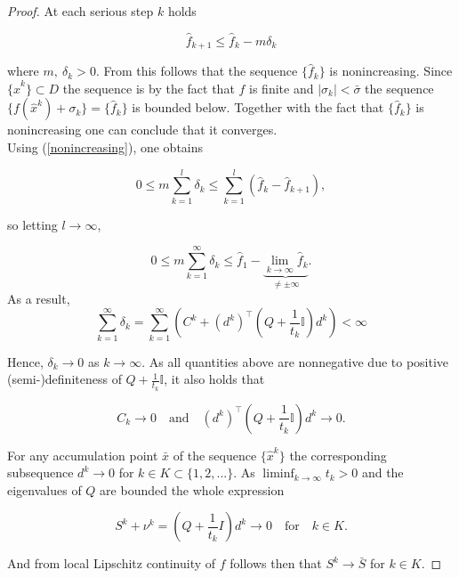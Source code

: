 \begin{proof}
	At each serious step \(k\) holds
	
	\begin{equation}
		\hat{f}_{k+1} \leq \hat{f}_k - m\delta_k
	\label{nonincreasing}
	\end{equation}
	
	where \(m, ~\delta_k > 0\). From this follows that the sequence \(\{\hat{f}_k\}\) is nonincreasing.
	Since \(\{\hat{x}^k\} \subset D\) the sequence is by the fact that \(f\) is finite %
	and \(|\sigma_k| < \bar{\sigma}\) the sequence \(\{f(\hat{x}^k)+\sigma_k\} = \{\hat{f}_k\}\) is bounded below. Together with the fact that \(\{\hat{f}_k\}\) is nonincreasing one can conclude that it converges. \\
	Using (\ref{nonincreasing}), one obtains
	
	\begin{equation}
		0 \leq m \sum_{k = 1}^l \delta_k \leq \sum_{k = 1}^l \left(\hat{f}_k-\hat{f}_{k+1}\right),
	\end{equation}
	
	so letting \(l \to \infty\), 
	
	\begin{equation}
		0 \leq m\sum_{k=1}^{\infty} \delta_k \leq \hat{f}_1 - \underbrace{\lim_{k \to \infty} \hat{f}_k}_{\neq \pm \infty}.
	\end{equation}
	As a result,
	\begin{equation}
		\sum_{k = 1}^{\infty} \delta_k = \sum_{k=1}^{\infty}\left(C^k+(d^k)^{\top}\left(Q+\frac{1}{t_k}\mathbb{I}\right)d^k\right) < \infty
	\end{equation}
	
	Hence, \(\delta_k \to 0\) as \(k \to \infty\). As all quantities above are nonnegative due to positive (semi-)definiteness of \(Q+\frac{1}{t_k}\mathbb{I}\), it also holds that
	
	\begin{equation}
		C_k \to 0 \quad \text{and} \quad (d^k)^{\top}\left(Q+\frac{1}{t_k}\mathbb{I}\right)d^k \to 0.
	\end{equation}
	
	For any accumulation point \(\bar{x}\) of the sequence \(\{\hat{x}^k\}\) the corresponding subsequence \(d^k \to 0\) for \(k \in K \subset \{1,2,...\} \). As \(\liminf_{k \to \infty} t_k > 0\) and the eigenvalues of \(Q\) are bounded the whole expression 
	
	\begin{equation}
	 S^k + \nu^k = \left(Q+\frac{1}{t_k}I \right)d^k  \to 0 \quad \text{for} \quad k \in K.
	\end{equation}
	
	And from local Lipschitz continuity of \(f\) follows then that \(S^k \to \bar{S}\) for \(k \in K\).
	
\end{proof}

